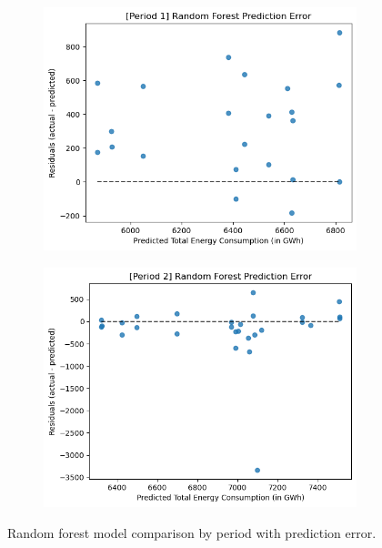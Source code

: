 \documentclass[runningheads]{llncs}
\begin{document}
\begin{center}
\begin{figure}[h]
\begin{subfigure}[h]{0.6\textwidth}
         \caption{}
         \label{fig:resultRF-p2}
    \end{subfigure}
    \begin{subfigure}[h]{0.60\textwidth}
         \centering
         \hspace*{-1.3in}
         \includegraphics[width=\textwidth]{results/rf/erp1.png}
         \caption{}
         \label{fig:errorRF-p1}
    \end{subfigure}
    \begin{subfigure}[h]{0.60\textwidth}
         \centering
         \hspace*{-1.3in}
         \includegraphics[width=\textwidth]{results/rf/erp2.png}
         \caption{}
         \label{fig:errorRF-p2}
    \end{subfigure}
    \caption{Random forest model comparison by period with prediction error.}
    \label{fig:rfwitherror}
\end{figure}
\end{center}
\end{document}
